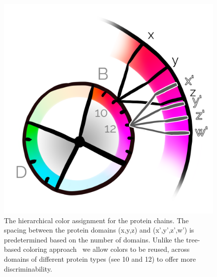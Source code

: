 \documentclass[review,journal]{vgtc}         %
\begin{document}
	
	
	\begin{figure}
		\centering
		\includegraphics[width=0.4\linewidth]{Figures/overlap}
		\caption{The hierarchical color assignment for the protein chains. 
			The spacing between the protein domains (x,y,z) and (x',y',z',w') is predetermined based on the number of domains. 
			Unlike the tree-based coloring approach~\cite{tennekes2014tree} we allow colors to be reused, across domains of different protein types (see 10 and 12) to offer more discriminability.
		}
		\label{fig:overlap}
	\end{figure}
	
\end{document}
